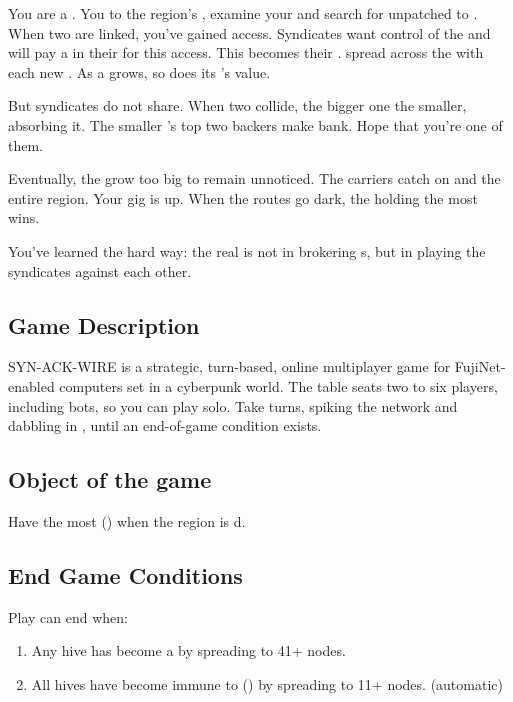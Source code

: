 You are a . You  to the region's , examine your  and search for unpatched  to .  When two  are linked, you've gained access. Syndicates want control of the  and will pay a  in their  for this access. This becomes their .  spread across the  with each new . As a  grows, so does its 's value. 

But syndicates do not share. When two  collide, the bigger one  the smaller, absorbing it. The smaller 's top two  backers make bank. Hope that you're one of them.

Eventually, the  grow too big to remain unnoticed. The carriers catch on and  the entire region. Your gig is up. When the routes go dark, the  holding the most  wins.

You've learned the hard way: the real  is not in brokering s, but in playing the syndicates against each other. 

\subsection{Game Description}
SYN-ACK-WIRE is a strategic, turn-based, online multiplayer game for FujiNet-enabled computers set in a cyberpunk world. The table seats two to six players, including bots, so you can play solo.  Take turns, spiking the network and dabbling in , until an end-of-game condition exists.

\subsection{Object of the game}
Have the most  () when the region is d.

\subsection{End Game Conditions}
Play can end when:
\begin{enumerate}
  \item Any hive has become a  by spreading to 41+ nodes.
  \item All hives have become immune to  () by spreading to 11+ nodes. (automatic)
\end{enumerate}

